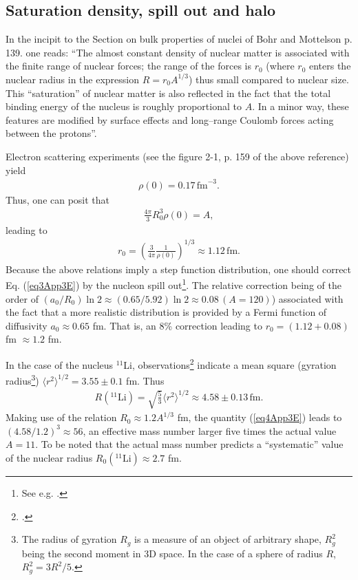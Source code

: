 \subsection{Saturation density, spill out and halo}\label{S4.10.1}
In the incipit to the Section on bulk properties of nuclei of Bohr and Mottelson \citep{Bohr:69} p. 139. one reads: ``The almost constant density of nuclear matter is associated with the finite range of nuclear forces; the range of the forces is $r_0$ (where $r_0$ enters the nuclear radius in the expression $R=r_0A^{1/3}$) thus small compared to nuclear size. This ``saturation'' of nuclear matter is also reflected in the fact that the total binding energy of the nucleus is roughly proportional to $A$. In a minor way, these features are modified by surface effects and long--range Coulomb forces acting between the protons''.



Electron scattering experiments (see the figure 2-1, p. 159 of the above reference) yield
\begin{align}
\rho(0)=0.17\,\text{fm}^{-3}.
\end{align}
Thus, one can posit that
\begin{align}
\frac{4\pi}{3}R_0^3\rho(0)=A,
\end{align}
leading to
\begin{align}\label{eq3App3E}
r_0=\left(\frac{3}{4\pi}\frac{1}{\rho(0)}\right)^{1/3}\approx 1.12\,\text{fm}.
\end{align}
Because the above relations imply a step function distribution, one should correct Eq. (\ref{eq3App3E}) by the nucleon spill out\footnote{See e.g. \cite{Bertsch:05}.}. The relative correction being of the order of $(a_0/R_0)\ln 2\approx (0.65/5.92)\ln 2\approx 0.08\, (A=120)$) associated with the fact that a more realistic distribution is provided by a Fermi function of diffusivity $a_0\approx 0.65$ fm. That is, an 8\% correction leading to $r_0=(1.12+0.08)$ fm $\approx 1.2$ fm. 


In the case of the nucleus $^{11}$Li, observations\footnote{\cite{Kobayashi:89}.} indicate a mean square (gyration radius\footnote{The radius of gyration $R_g$ is a measure of an object of arbitrary shape, $R^2_g$ being the second moment in 3D space. In the case of a sphere of radius $R$, $R^2_g=3R^2/5$.}) $\langle r^2\rangle^{1/2}=3.55\pm 0.1$ fm. Thus
\begin{align}\label{eq4App3E}
R(^{11}\text{Li})=\sqrt{\frac{5}{3}}\langle r^2\rangle^{1/2}\approx 4.58\pm 0.13\,\text{fm}.
\end{align}
Making use of the relation $R_0\approx1.2 A^{1/3}$ fm, the quantity (\ref{eq4App3E}) leads to $(4.58/1.2)^3\approx56$, an effective mass number larger five times the actual value $A=11$. To be noted that the actual mass number predicts a ``systematic'' value of the nuclear radius $R_0(^{11}\text{Li})\approx 2.7$ fm.


